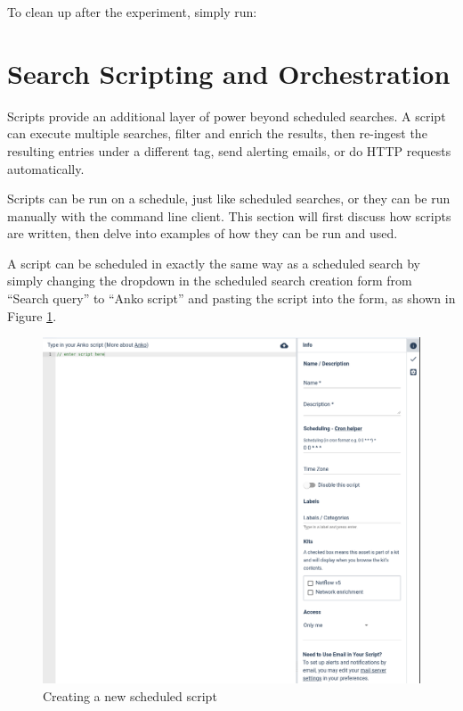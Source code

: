 To clean up after the experiment, simply run:




\section{Search Scripting and Orchestration}
Scripts provide an additional layer of power beyond scheduled
searches. A script can execute multiple searches, filter and enrich the
results, then re-ingest the resulting entries under a different tag,
send alerting emails, or do HTTP requests automatically.

Scripts can be run on a schedule, just like scheduled searches, or they
can be run manually with the command line client. This section will
first discuss how scripts are written, then delve into examples of how
they can be run and used.

A script can be scheduled in exactly the same way as a scheduled search
by simply changing the dropdown in the scheduled search creation form
from ``Search query'' to ``Anko script'' and pasting the script into the
form, as shown in Figure \ref{fig:create-soar}.

\begin{figure}
	\includegraphics{images/create-soar.png}
	\caption{Creating a new scheduled script}
	\label{fig:create-soar}
\end{figure}

